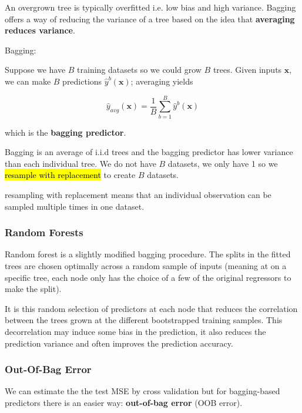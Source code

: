 \documentclass[11pt]{article}
\begin{document}
An overgrown tree is typically overfitted i.e. low bias and high variance. Bagging offers a way of reducing the variance of a tree based on the idea that \textbf{averaging reduces variance}.

\begin{definition}
    Bagging:

    Suppose we have $B$ training datasets so we could grow $B$ trees. Given inputs $\mathbf{x}$, we can make $B$ predictions $\hat{y}^b(\mathbf{x})$; averaging yields

    \begin{equation*}
        \hat{y}_{avg}(\mathbf{x}) = \dfrac{1}{B}\sum_{b=1}^B \hat{y}^b(\mathbf{x})
    \end{equation*}

    which is the \textbf{bagging predictor}. 
\end{definition}

Bagging is an average of i.i.d trees and the bagging predictor has lower variance than each individual tree. We do not have $B$ datasets, we only have 1 so we \hl{resample with replacement} to create $B$ datasets.

\begin{note}
    resampling with replacement means that an individual observation can be sampled multiple times in one dataset.
\end{note}
\subsubsection{Random Forests}

Random forest is a slightly modified bagging procedure. The splits in the fitted trees are chosen optimally across a random sample of inputs (meaning at on a specific tree, each node only has the choice of a few of the original regressors to make the split).

It is this random selection of predictors at each node that reduces the correlation between the trees grown at the different bootstrapped training samples. This decorrelation may induce some bias in the prediction, it also reduces the prediction variance and often improves the prediction accuracy.

\subsubsection{Out-Of-Bag Error}

We can estimate the the test MSE by cross validation but for bagging-based predictors there is an easier way: \textbf{out-of-bag error} (OOB error).
\end{document}
